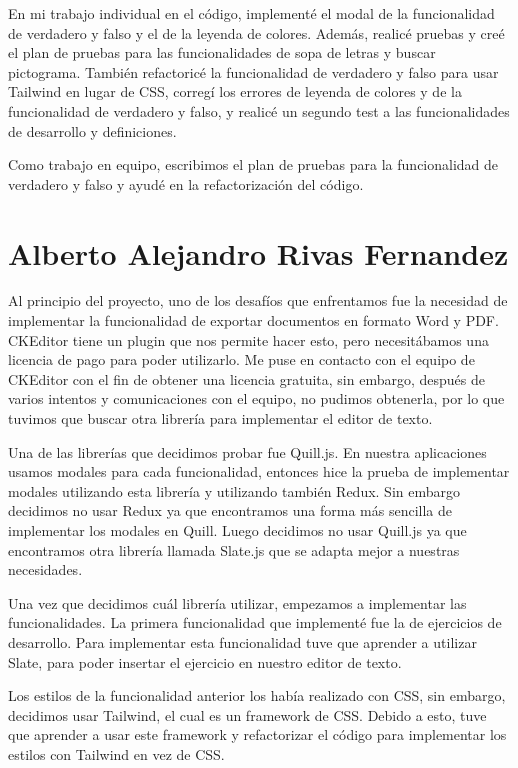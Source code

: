 En mi trabajo individual en el código, implementé el modal de la funcionalidad de verdadero y falso y el de la leyenda de colores. Además, realicé pruebas y creé el plan de pruebas para las funcionalidades de sopa de letras y buscar pictograma. También refactoricé la funcionalidad de verdadero y falso para usar Tailwind en lugar de CSS, corregí los errores de leyenda de colores y de la funcionalidad de verdadero y falso, y realicé un segundo test a las funcionalidades de desarrollo y definiciones.

Como trabajo en equipo, escribimos el plan de pruebas para la funcionalidad de verdadero y falso y ayudé en la refactorización del código.

\section{Alberto Alejandro Rivas Fernandez}
Al principio del proyecto, uno de los desafíos que enfrentamos fue la necesidad de implementar la funcionalidad de exportar documentos en formato Word y PDF. CKEditor tiene un plugin que nos permite hacer esto, pero necesitábamos una licencia de pago para poder utilizarlo. Me puse en contacto con el equipo de CKEditor con el fin de obtener una licencia gratuita, sin embargo, después de varios intentos y comunicaciones con el equipo, no pudimos obtenerla, por lo que tuvimos que buscar otra librería para implementar el editor de texto.

Una de las librerías que decidimos probar fue Quill.js. En nuestra aplicaciones usamos modales para cada funcionalidad, entonces hice la prueba de implementar modales utilizando esta librería y utilizando también Redux. Sin embargo decidimos no usar Redux ya que encontramos una forma más sencilla de implementar los modales en Quill. Luego decidimos no usar Quill.js ya que encontramos otra librería llamada Slate.js que se adapta mejor a nuestras necesidades.

Una vez que decidimos cuál librería utilizar, empezamos a implementar las funcionalidades. La primera funcionalidad que implementé fue la de ejercicios de desarrollo. Para implementar esta funcionalidad tuve que aprender a utilizar Slate, para poder insertar el ejercicio en nuestro editor de texto.

Los estilos de la funcionalidad anterior los había realizado con CSS, sin embargo, decidimos usar Tailwind, el cual es un framework de CSS. Debido a esto, tuve que aprender a usar este framework y refactorizar el código para implementar los estilos con Tailwind en vez de CSS.

